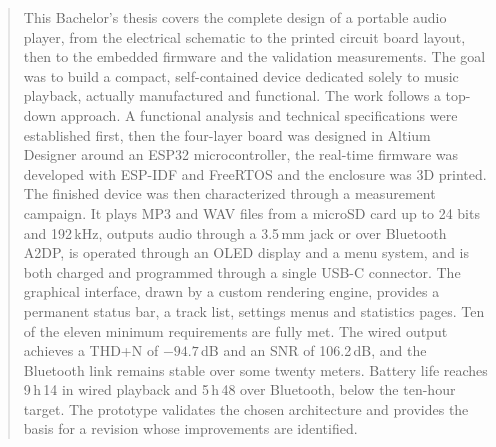 \begin{abstract}
    This Bachelor's thesis covers the complete design of a portable audio player, from the electrical schematic to the printed circuit board layout, then to the embedded firmware and the validation measurements. The goal was to build a compact, self-contained device dedicated solely to music playback, actually manufactured and functional. The work follows a top-down approach. A functional analysis and technical specifications were established first, then the four-layer board was designed in Altium Designer around an ESP32 microcontroller, the real-time firmware was developed with ESP-IDF and FreeRTOS and the enclosure was 3D printed. The finished device was then characterized through a measurement campaign. It plays MP3 and WAV files from a microSD card up to 24 bits and 192\,kHz, outputs audio through a 3.5\,mm jack or over Bluetooth A2DP, is operated through an OLED display and a menu system, and is both charged and programmed through a single USB-C connector. The graphical interface, drawn by a custom rendering engine, provides a permanent status bar, a track list, settings menus and statistics pages. Ten of the eleven minimum requirements are fully met. The wired output achieves a THD+N of $-94.7$\,dB and an SNR of 106.2\,dB, and the Bluetooth link remains stable over some twenty meters. Battery life reaches 9\,h\,14 in wired playback and 5\,h\,48 over Bluetooth, below the ten-hour target. The prototype validates the chosen architecture and provides the basis for a revision whose improvements are identified.
    
\end{abstract}